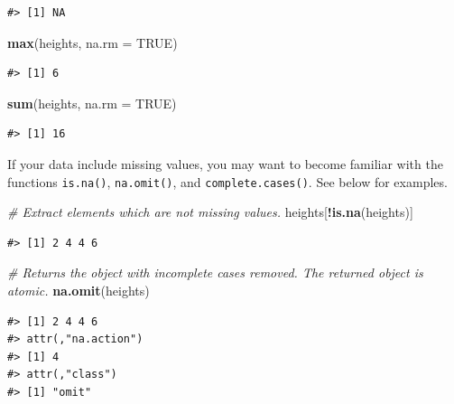 \documentclass[]{book}
\newenvironment{Shaded}{\begin{snugshade}}{\end{snugshade}}
\newcommand{\KeywordTok}[1]{\textcolor[rgb]{0.13,0.29,0.53}{\textbf{#1}}}
\newcommand{\DataTypeTok}[1]{\textcolor[rgb]{0.13,0.29,0.53}{#1}}
\newcommand{\CommentTok}[1]{\textcolor[rgb]{0.56,0.35,0.01}{\textit{#1}}}
\newcommand{\OtherTok}[1]{\textcolor[rgb]{0.56,0.35,0.01}{#1}}
\newcommand{\OperatorTok}[1]{\textcolor[rgb]{0.81,0.36,0.00}{\textbf{#1}}}
\newcommand{\NormalTok}[1]{#1}
\begin{document}
\begin{verbatim}
#> [1] NA
\end{verbatim}

\begin{Shaded}
\begin{Highlighting}[]
\KeywordTok{max}\NormalTok{(heights, }\DataTypeTok{na.rm =} \OtherTok{TRUE}\NormalTok{)}
\end{Highlighting}
\end{Shaded}

\begin{verbatim}
#> [1] 6
\end{verbatim}

\begin{Shaded}
\begin{Highlighting}[]
\KeywordTok{sum}\NormalTok{(heights, }\DataTypeTok{na.rm =} \OtherTok{TRUE}\NormalTok{)}
\end{Highlighting}
\end{Shaded}

\begin{verbatim}
#> [1] 16
\end{verbatim}

If your data include missing values, you may want to become familiar
with the functions \texttt{is.na()}, \texttt{na.omit()}, and
\texttt{complete.cases()}. See below for examples.

\begin{Shaded}
\begin{Highlighting}[]
\CommentTok{# Extract elements which are not missing values.}
\NormalTok{heights[}\OperatorTok{!}\KeywordTok{is.na}\NormalTok{(heights)]}
\end{Highlighting}
\end{Shaded}

\begin{verbatim}
#> [1] 2 4 4 6
\end{verbatim}

\begin{Shaded}
\begin{Highlighting}[]
\CommentTok{# Returns the object with incomplete cases removed. The returned object is atomic.}
\KeywordTok{na.omit}\NormalTok{(heights)}
\end{Highlighting}
\end{Shaded}

\begin{verbatim}
#> [1] 2 4 4 6
#> attr(,"na.action")
#> [1] 4
#> attr(,"class")
#> [1] "omit"
\end{verbatim}
\end{document}
